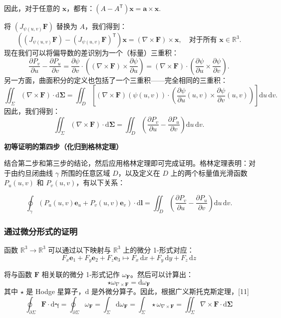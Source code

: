 因此，对于任意的 \(\mathbf{x}\)，都有：\((A - A^{\mathsf{T}}) \mathbf{x} = \mathbf{a} \times \mathbf{x}.\)

将 \((J_{\psi(u, v)} \mathbf{F})\) 替换为 \(A\)，我们得到：
\[
\left( (J_{\psi(u, v)} \mathbf{F}) - (J_{\psi(u, v)} \mathbf{F})^{\mathsf{T}} \right) \mathbf{x} = (\nabla \times \mathbf{F}) \times \mathbf{x}, \quad \text{对于所有 } \mathbf{x} \in \mathbb{R}^3.~
\]
现在我们可以将偏导数的差识别为一个（标量）三重积：
\[
\frac{\partial P_v}{\partial u} - \frac{\partial P_u}{\partial v} = \frac{\partial \psi}{\partial v} \cdot \left( (\nabla \times \mathbf{F}) \times \frac{\partial \psi}{\partial u} \right) = (\nabla \times \mathbf{F}) \cdot \left( \frac{\partial \psi}{\partial u} \times \frac{\partial \psi}{\partial v} \right).~
\]
另一方面，曲面积分的定义也包括了一个三重积——完全相同的三重积：
\[
\iint_{\Sigma} (\nabla \times \mathbf{F}) \cdot \mathrm{d} \mathbf{\Sigma} = \iint_{D} \left[ (\nabla \times \mathbf{F})(\psi(u, v)) \cdot \left( \frac{\partial \psi}{\partial u}(u, v) \times \frac{\partial \psi}{\partial v}(u, v) \right) \right] \mathrm{d}u \, \mathrm{d}v.~
\]
因此，我们得到：
\[
\iint_{\Sigma} (\nabla \times \mathbf{F}) \cdot \mathrm{d} \mathbf{\Sigma} = \iint_{D} \left( \frac{\partial P_v}{\partial u} - \frac{\partial P_u}{\partial v} \right) \mathrm{d}u \, \mathrm{d}v.~
\]

\textbf{初等证明的第四步（化归到格林定理）}

结合第二步和第三步的结论，然后应用格林定理即可完成证明。格林定理表明：对于由约旦闭曲线 \(\gamma\) 所围的任意区域 \(D\)，以及定义在 \(D\) 上的两个标量值光滑函数 \(P_u(u, v)\) 和 \(P_v(u, v)\)，有以下关系：

\[
\oint_{\gamma} \left( P_u(u, v) \mathbf{e}_u + P_v(u, v) \mathbf{e}_v \right) \cdot \mathrm{d} \mathbf{l} 
= \iint_{D} \left( \frac{\partial P_v}{\partial u} - \frac{\partial P_u}{\partial v} \right) \mathrm{d}u \, \mathrm{d}v.~
\]
\subsubsection{通过微分形式的证明}

函数 \(\mathbb{R}^3 \to \mathbb{R}^3\) 可以通过以下映射与 \(\mathbb{R}^3\) 上的微分 1-形式对应：
\[
F_x \mathbf{e}_1 + F_y \mathbf{e}_2 + F_z \mathbf{e}_3 \mapsto F_x \, \mathrm{d}x + F_y \, \mathrm{d}y + F_z \, \mathrm{d}z~
\]

将与函数 \(\mathbf{F}\) 相关联的微分 1-形式记作 \(\omega_{\mathbf{F}}\)。然后可以计算出：
\[
\star \omega_{\nabla \times \mathbf{F}} = \mathrm{d} \omega_{\mathbf{F}}~
\]
其中 \(\star\) 是 Hodge 星算子，\(\mathrm{d}\) 是外微分算子。因此，根据广义斯托克斯定理，[11]
\[
\oint_{\partial \Sigma} \mathbf{F} \cdot \mathrm{d} \mathbf{\gamma} 
= \oint_{\partial \Sigma} \omega_{\mathbf{F}} 
= \int_{\Sigma} \mathrm{d} \omega_{\mathbf{F}} 
= \int_{\Sigma} \star \omega_{\nabla \times \mathbf{F}} 
= \iint_{\Sigma} \nabla \times \mathbf{F} \cdot \mathrm{d} \mathbf{\Sigma}~
\]
